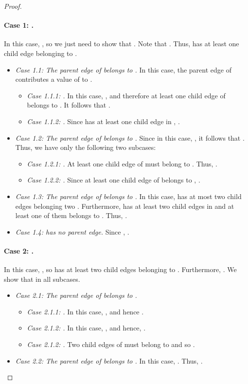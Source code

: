 \documentclass[smallextended]{svjour3}
\begin{document}
\begin{proof}
\paragraph{Case 1: .} In this case, , so we just need to show that .
Note that . Thus,  has at least one child edge belonging to .
\begin{itemize} \item {\em Case 1.1: The parent edge of  belongs to .}
  In this case, the parent edge of  contributes a value of  to . 
\begin{itemize}\item {\em Case 1.1.1: .} In this case, , and therefore at least one child edge of  belongs to . It follows that .
\item {\em Case 1.1.2: .} Since  has at least one child edge in , .
\end{itemize}
\item {\em Case 1.2: The parent edge of  belongs to .}
  Since in this case, , it follows that .
  Thus, we have only the following two subcases:
\begin{itemize}\item {\em Case 1.2.1: .} At least one child edge of  must belong to . Thus, .
\item {\em Case 1.2.2: .} Since at least one child edge of  belongs to , .
\end{itemize}
\item {\em Case 1.3: The parent edge of  belongs to .}
  In this case,  has at most two child edges belonging two .
  Furthermore,  has at least two child edges in  and at least one of them belongs to .
  Thus, .

\item {\em Case 1.4:  has no parent edge.} Since , .
\end{itemize}
\paragraph{Case 2: .} In this case, , so  has at least two child edges belonging to . 
Furthermore, .
We show that  in all subcases.
\begin{itemize}
\item {\em Case 2.1: The parent edge of  belongs to .}
\begin{itemize}
\item {\em Case 2.1.1: .} In this case, , and hence .
\item {\em Case 2.1.2: .} In this case, , and hence, .
\item {\em Case 2.1.2: .} Two child edges of  must belong to  and so .
\end{itemize}
\item {\em Case 2.2: The parent edge of  belongs to .}
In this case, . Thus, .


\end{itemize}
\end{proof}
\end{document}
